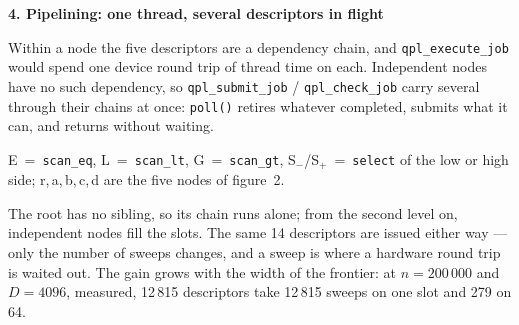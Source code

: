 \documentclass[11pt]{article}
\newcommand{\op}[1]{\texttt{#1}}
\begin{document}
{\large\bfseries 4. Pipelining: one thread, several descriptors in flight}

Within a node the five descriptors are a dependency chain, and
\op{qpl\_execute\_job} would spend one device round trip of thread time on each.
Independent nodes have no such dependency, so \op{qpl\_submit\_job} /
\op{qpl\_check\_job} carry several through their chains at once:
\op{poll()} retires whatever completed, submits what it can, and returns without
waiting.

\begin{center}
\end{center}

E~=~\op{scan\_eq}, L~=~\op{scan\_lt}, G~=~\op{scan\_gt},
S$_-$/S$_+$~=~\op{select} of the low or high side; r,\,a,\,b,\,c,\,d are the five
nodes of figure~2.

The root has no sibling, so its chain runs alone; from the second level on,
independent nodes fill the slots. The same 14 descriptors are issued either way
--- only the number of sweeps changes, and a sweep is where a hardware round trip
is waited out. The gain grows with the width of the frontier: at $n=200\,000$
and $D=4096$, measured, 12\,815 descriptors take 12\,815 sweeps on one slot and
279 on 64.
\end{document}
